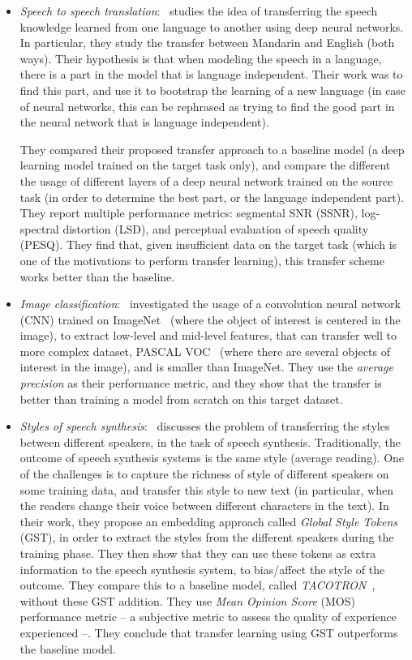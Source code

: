 \begin{itemize}
    \item \textit{Speech to speech translation}:~\citep{xu2014cross} studies the idea of transferring the speech knowledge learned from one language to another using deep neural networks. In particular, they study the transfer between Mandarin and English (both ways). Their hypothesis is that when modeling the speech in a language, there is a part in the model that is language independent. Their work was to find this part, and use it to bootstrap the learning of a new language (in case of neural networks, this can be rephrased as trying to find the good part in the neural network that is language independent).

    They compared their proposed transfer approach to a baseline model (a deep learning model trained on the target task only), and compare the different the usage of different layers of a deep neural network trained on the source task (in order to determine the best part, or the language independent part). They report multiple performance metrics: segmental SNR (SSNR), log-spectral distortion (LSD), and perceptual evaluation of speech quality (PESQ). They find that, given insufficient data on the target task (which is one of the motivations to perform transfer learning), this transfer scheme works better than the baseline.

    \item \textit{Image classification}:~\citep{oquab2014learning} investigated the usage of a convolution neural network (CNN) trained on ImageNet~\citep{imagenet_cvpr09} (where the object of interest is centered in the image), to extract low-level and mid-level features, that can transfer well to more complex dataset, PASCAL VOC~\citep{everingham2010pascal} (where there are several objects of interest in the image), and is smaller than ImageNet. They use the \textit{average precision} as their performance metric, and they show that the transfer is better than training a model from scratch on this target dataset.

    \item \textit{Styles of speech synthesis}:~\citep{wang2018style} discusses the problem of transferring the styles between different speakers, in the task of speech synthesis. Traditionally, the outcome of speech synthesis systems is the same style (average reading). One of the challenges is to capture the richness of style of different speakers on some training data, and transfer this style to new text (in particular, when the readers change their voice between different characters in the text). In their work, they propose an embedding approach called \textit{Global Style Tokens} (GST), in order to extract the styles from the different speakers during the training phase. They then show that they can use these tokens as extra information to the speech synthesis system, to bias/affect the style of the outcome.
    They compare this to a baseline model, called \textit{TACOTRON}~\citep{wang2017tacotron}, without these GST addition. They use \textit{Mean Opinion Score} (MOS) performance metric -- a subjective metric to assess the quality of experience experienced --. They conclude that transfer learning using GST outperforms the baseline model.


\end{itemize}

